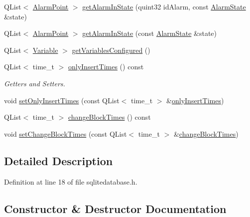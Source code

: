 \begin{DoxyCompactItemize}
Q\+List$<$ \hyperlink{class_alarm_point}{Alarm\+Point} $>$ \hyperlink{class_s_q_lite_database_aa1e3d9fa85ea5423cd441a047c4093b6}{get\+Alarm\+In\+State} (quint32 id\+Alarm, const \hyperlink{alarm__states__enum_8h_a493dfe4e2144bc496098813185ca09bf}{Alarm\+State} \&state)
\item 
Q\+List$<$ \hyperlink{class_alarm_point}{Alarm\+Point} $>$ \hyperlink{class_s_q_lite_database_a33e2cc09cd5ee5c3564ab9348d58fb66}{get\+Alarm\+In\+State} (const \hyperlink{alarm__states__enum_8h_a493dfe4e2144bc496098813185ca09bf}{Alarm\+State} \&state)
\item 
Q\+List$<$ \hyperlink{class_variable}{Variable} $>$ \hyperlink{class_s_q_lite_database_a3d543d20182c6471add4fab669d48725}{get\+Variables\+Configured} ()
\item 
Q\+List$<$ time\+\_\+t $>$ \hyperlink{class_s_q_lite_database_affefb1f90bec5ad627b9d93229756b64}{only\+Insert\+Times} () const 
\begin{DoxyCompactList}\small\item\em Getters and Setters. \end{DoxyCompactList}\item 
void \hyperlink{class_s_q_lite_database_a0b35de830a4daec4bf735fb1a9add53f}{set\+Only\+Insert\+Times} (const Q\+List$<$ time\+\_\+t $>$ \&\hyperlink{class_s_q_lite_database_affefb1f90bec5ad627b9d93229756b64}{only\+Insert\+Times})
\item 
Q\+List$<$ time\+\_\+t $>$ \hyperlink{class_s_q_lite_database_ae746739961ea23178aa03f5fb2779eee}{change\+Block\+Times} () const 
\item 
void \hyperlink{class_s_q_lite_database_a9feadb54cfa9bf6eb7f9ae3bfd0c7995}{set\+Change\+Block\+Times} (const Q\+List$<$ time\+\_\+t $>$ \&\hyperlink{class_s_q_lite_database_ae746739961ea23178aa03f5fb2779eee}{change\+Block\+Times})
\end{DoxyCompactItemize}


\subsection{Detailed Description}


Definition at line 18 of file sqlitedatabase.\+h.



\subsection{Constructor \& Destructor Documentation}
\hypertarget{class_s_q_lite_database_af1652162395df728e2d37a54f9438392}{}
